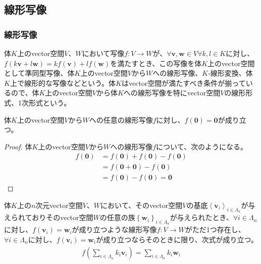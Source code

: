 \documentclass[dvipdfmx]{jsarticle}
\begin{document}
\subsection{線形写像}%
\subsubsection{線形写像}%
\begin{dfn}\label{線形写像}
体$K$上のvector空間$V$、$W$において写像$f:V \rightarrow W$が、$\forall\mathbf{v},\mathbf{w} \in V\forall k,l \in K$に対し、$f\left( k\mathbf{v} + l\mathbf{w} \right) = kf\left( \mathbf{v} \right) + lf\left( \mathbf{w} \right)$を満たすとき、この写像を体$K$上のvector空間として準同型写像、体$K$上のvector空間$V$から$W$への線形写像、$K$-線形変換、体$K$上で線形的な写像などという。体$K$はvector空間が満たすべき条件が揃っているので、体$K$上のvector空間$V$から体$K$への線形写像を特にvector空間$V$の線形形式、1次形式という。
\end{dfn}
\begin{thm}\label{2.1.2.1}
体$K$上のvector空間$V$から$W$への任意の線形写像$f$に対し、$f\left( \mathbf{0} \right) = \mathbf{0}$が成り立つ。
\end{thm}
\begin{proof}
体$K$上のvector空間$V$から$W$への線形写像$f$について、次のようになる。
\begin{align*}
f\left( \mathbf{0} \right) &= f\left( \mathbf{0} \right) + f\left( \mathbf{0} \right) - f\left( \mathbf{0} \right)\\
&= f\left( \mathbf{0} + \mathbf{0} \right) - f\left( \mathbf{0} \right)\\
&= f\left( \mathbf{0} \right) - f\left( \mathbf{0} \right) = \mathbf{0}
\end{align*}
\end{proof}
\begin{thm}\label{2.1.2.2}
体$K$上の$n$次元vector空間$V$、$W$において、そのvector空間$V$の基底$\left\langle \mathbf{v}_{i} \right\rangle_{i \in \varLambda_{n}}$が与えられておりそのvector空間$W$の任意の族$\left\{ \mathbf{w}_{i} \right\}_{i \in \varLambda_{n}}$が与えられたとき、$\forall i \in \varLambda_{n}$に対し、$f\left( \mathbf{v}_{i} \right) = \mathbf{w}_{i}$が成り立つような線形写像$f:V \rightarrow W$がただ1つ存在し、$\forall i \in \varLambda_{n}$に対し、$f\left( \mathbf{v}_{i} \right) = \mathbf{w}_{i}$が成り立つならそのときに限り、次式が成り立つ。
\begin{align*}
f\left( \sum_{i \in \varLambda_{n}} {k_{i}\mathbf{v}_{i}} \right) = \sum_{i \in \varLambda_{n}} {k_{i}\mathbf{w}_{i}}
\end{align*}
\end{thm}
\end{document}
